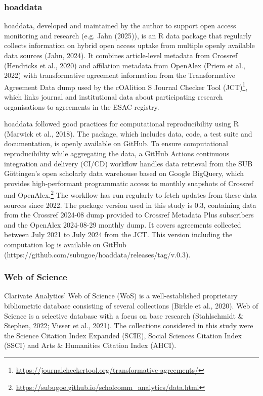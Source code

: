 \documentclass[a4paper,man,floatsintext,longtable,noextraspace,10pt]{apa6}
\begin{document}
\subsubsection{hoaddata}\label{hoaddata}

hoaddata, developed and maintained by the author to support open access
monitoring and research (e.g. Jahn (2025)), is an R data package that
regularly collects information on hybrid open access uptake from
multiple openly available data sources (Jahn, 2024). It combines
article-level metadata from Crossref (Hendricks et al., 2020) and
affilation metadata from OpenAlex (Priem et al., 2022) with
transformative agreement information from the Transformative Agreement
Data dump used by the cOAlition S Journal Checker Tool (JCT)\footnote{\url{https://journalcheckertool.org/transformative-agreements/}},
which links journal and institutional data about participating research
organisations to agreements in the ESAC registry.

hoaddata followed good practices for computational reproducibility using
R (Marwick et al., 2018). The package, which includes data, code, a test
suite and documentation, is openly available on GitHub. To ensure
computational reproducibility while aggregating the data, a GitHub
Actions continuous integration and delivery (CI/CD) workflow handles
data retrieval from the SUB Göttingen's open scholarly data warehouse
based on Google BigQuery, which provides high-performant programmatic
access to monthly snapshots of Crossref and OpenAlex.\footnote{\url{https://subugoe.github.io/scholcomm_analytics/data.html}}
The workflow has run regularly to fetch updates from these data sources
since 2022. The package version used in this study is 0.3, containing
data from the Crossref 2024-08 dump provided to Crossref Metadata Plus
subscribers and the OpenAlex 2024-08-29 monthly dump. It covers
agreements collected between July 2021 to July 2024 from the JCT. This
version including the computation log is available on GitHub
(https://github.com/subugoe/hoaddata/releases/tag/v.0.3).

\subsubsection{Web of Science}\label{web-of-science}

Clarivate Analytics' Web of Science (WoS) is a well-established
proprietary bibliometric database consisting of several collections
(Birkle et al., 2020). Web of Science is a selective database with a
focus on base research (Stahlschmidt \& Stephen, 2022; Visser et al.,
2021). The collections considered in this study were the Science
Citation Index Expanded (SCIE), Social Sciences Citation Index (SSCI)
and Arts \& Humanities Citation Index (AHCI).
\end{document}
